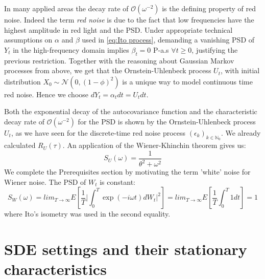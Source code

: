 \documentclass[%
thesis=student,%
coverpage=false,%
titlepage=false,%
headmarks=true, %
english,%
font=libertine, %
math=newpxtx, %
BCOR=5mm,%
coverBCOR=11mm%
]{tumbook}
\begin{document}
In many applied areas the decay rate of $\mathcal{O}(\omega^{-2})$ is the defining property of red noise. Indeed the term \textit{red noise} is due to the fact that low frequencies have the highest amplitude in red light and the PSD. 
Under appropriate technical assumptions on $\alpha$ and $\beta$ used in \ref{eq:Ito process}, demanding a vanishing PSD of $Y_{t}$ in the high-frequency domain implies $\beta_{t} = 0$ P-a.s $\forall t \geq 0$, justifying the previous restriction. Together with the reasoning about Gaussian Markov processes from above, we get that the Ornstein-Uhlenbeck process $U_{t}$, with initial distribution $X_{0} \sim \mathcal{N}(0,(1-\phi)^2)$ is a unique way to model continuous time red noise. Hence we choose $dY_{t} = \alpha_{t}dt = U_{t}dt$. 

Both the exponential decay of the autocovariance function and the characteristic decay rate of $\mathcal{O}(\omega^{-2})$ for the PSD is shown by the Ornstein-Uhlenbeck process $U_{t}$, as we have seen for the discrete-time red noise process $(\epsilon_{k})_{k\in\mathbb{N}_{0}}$. We already calculated $R_{U}(\tau)$. 
An application of the Wiener-Khinchin theorem gives us: 
\[
    S_{U}(\omega) = \frac{1}{\theta^{2} + \omega^{2}}
\]
We complete the Prerequisites section by motivating the term 'white' noise for Wiener noise. The PSD of $W_{t}$ is constant:
\[
S_{W}(\omega) =  lim_{T\rightarrow\infty}E[\frac{1}{T}\lvert\int_{0}^{T}\exp(-i\omega t)dW_{t}\rvert^{2}] = lim_{T\rightarrow \infty}E[\frac{1}{T}\int_{0}^{T}1dt] = 1
\]
where Ito's isometry was used in the second equality.



\chapter{SDE settings and their stationary characteristics}
\end{document}
